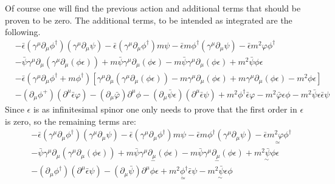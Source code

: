 \documentclass[11pt, oneside]{article}   	%
\begin{document}
\begin{enumerate}[label=\alph*)]
Of course one will find the previous action and additional terms that should be proven to be zero. The additional terms, to be intended as integrated are the following.
\begin{align*}
& -\bar{\epsilon}\left(\gamma^{\mu} \partial_{\mu} \phi^{\dagger}\right)\left(\gamma^{\mu} \partial_{\mu} \psi\right)-\bar{\epsilon}\left(\gamma^{\mu} \partial_{\mu} \phi^{\dagger}\right) m \psi-\bar{\epsilon} m \phi^{\dagger}\left(\gamma^{\mu} \partial_{\mu} \psi\right)-\bar{\epsilon} m^{2} \varphi \phi^{\dagger} \\
& -\bar{\psi}\gamma^{\mu} \partial_{\mu}\left(\gamma^{\mu} \partial_{\mu}(\phi \epsilon )\right) + m \bar{\psi} \gamma^\mu \partial_\mu (\phi \epsilon) - m\bar{\psi} \gamma^\mu \partial_\mu(\phi \epsilon) + m^2 \bar{\psi} \phi \epsilon \\
&-\bar{\epsilon}\left(\gamma^{\mu} \partial_{\mu} \phi^{\dagger}+ m \phi^{\dagger}\right)\left[\gamma^{\mu} \partial_{\mu}\left(\gamma^{\mu} \partial_{\mu}(\phi \epsilon)\right) -m \gamma^{\mu} \partial_{\mu}(\phi \epsilon)+m  \gamma^{\mu} \partial_{\mu}(\phi \epsilon)-m^{2} \phi \epsilon \right] \\
& -\left(\partial_{\mu} \phi^{+}\right)\left(\partial^{\mu} \bar{\epsilon} \varphi\right)-\left(\partial_{\mu} \bar{\varphi}\right) \partial^{\mu} \phi-\left(\partial_{\mu} \bar{\psi} \epsilon\right)\left(\partial^{\mu} \bar{\epsilon} \psi\right) + m^{2} \phi^{\dagger} \bar{\epsilon} \varphi- m^{2} \bar{\varphi} \epsilon \phi - m^2 \bar{\psi} \epsilon\bar{\epsilon} \psi
\end{align*}
Since $\epsilon$ is as infinitesimal spinor one only needs to prove that the first order in $\epsilon$ is zero, so the remaining terms are:
\begin{align*}
	& -\bar{\epsilon}\left(\gamma^{\mu} \partial_{\mu} \phi^{\dagger}\right)\left(\gamma^{\mu} \partial_{\mu} \psi\right)-\bar{\epsilon}\left(\gamma^{\mu} \partial_{\mu} \phi^{\dagger}\right) m \psi-\bar{\epsilon} m \phi^{\dagger}\left(\gamma^{\mu} \partial_{\mu} \psi\right)- \underset{\simeq}{\bar{\epsilon} m^{2} \varphi \phi^{\dagger}} \\
	& -\bar{\psi}\gamma^{\mu} \partial_{\mu}\left(\gamma^{\mu} \partial_{\mu}(\phi \epsilon )\right) + \underset{- }{m \bar{\psi} \gamma^\mu \partial_\mu (\phi \epsilon)} - \underset{-}{m\bar{\psi} \gamma^\mu \partial_\mu(\phi \epsilon)} + \underset{\sim}{m^2 \bar{\psi} \phi \epsilon} \\
	& -\left(\partial_{\mu} \phi^{\dagger}\right)\left(\partial^{\mu} \bar{\epsilon} \psi\right)-\left(\partial_{\mu} \bar{\psi}\right) \partial^{\mu} \phi \epsilon + \underset{\simeq}{m^{2} \phi^{\dagger} \bar{\epsilon} \psi} - \underset{\sim}{m^{2} \bar{\psi} \epsilon \phi}

\end{align*}
\end{enumerate}
\end{document}
